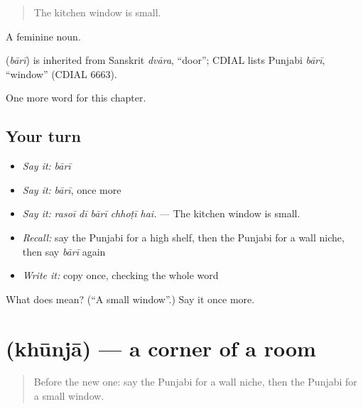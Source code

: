 \begin{quote}
The kitchen window is small.
\end{quote}

A feminine noun.

\begin{cousinweb}
\textbf{} (\emph{bārī}) is inherited from Sanskrit \emph{dvāra}, \textquotedblleft{}door\textquotedblright{}; CDIAL lists Punjabi \emph{bārī}, \textquotedblleft{}window\textquotedblright{} (CDIAL 6663).
\end{cousinweb}

\begin{grammarlens}[title={What you've built}]
One more word for this chapter.
\end{grammarlens}

\subsection*{Your turn}
\begin{itemize}
\raggedright
  \item \emph{Say it:} \emph{bārī}
  \item \emph{Say it:} \emph{bārī}, once more
  \item \emph{Say it:} \emph{rasoī dī bārī chhoṭī hai.} — The kitchen window is small.
  \item \emph{Recall:} say the Punjabi for a high shelf, then the Punjabi for a wall niche, then say \emph{bārī} again
  \item \emph{Write it:} copy \textbf{} once, checking the whole word
\end{itemize}

\begin{tcolorbox}[breakable,colback=teal!4,colframe=teal!35!black,title={Before you move on}]
What does  mean? (\textquotedblleft{}A small window\textquotedblright{}.) Say it once more.
\end{tcolorbox}
\section[\texorpdfstring{\pa{ਖੂੰਜਾ} (khūnjā)}{ਖੂੰਜਾ (khūnjā)}]{ (khūnjā) — a corner of a room}

\label{lesson:PA-C247-khunja}



\begin{quote}
Before the new one: say the Punjabi for a wall niche, then the Punjabi for a small window.
\end{quote}

